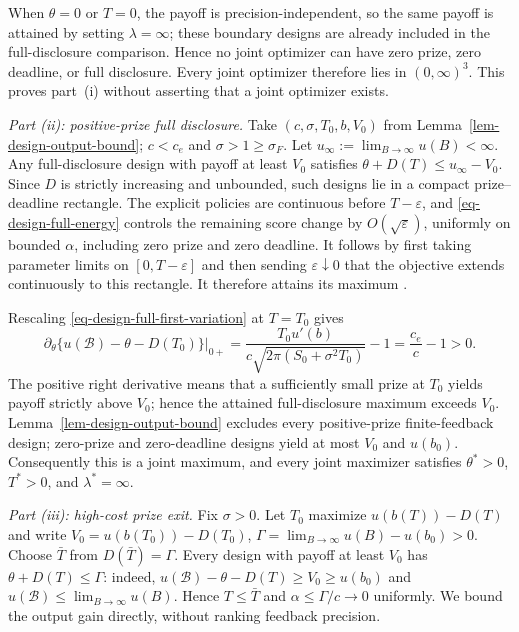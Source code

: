 \documentclass[mnsc]{informs3}
\begin{document}
\begin{APPENDICES}
{When $\theta=0$ or $T=0$, the payoff is precision-independent, so the
same payoff is attained by setting $\lambda=\infty$; these boundary
designs are already included in the full-disclosure comparison. Hence no
joint optimizer can have zero prize, zero deadline, or full disclosure.
Every joint optimizer therefore lies in $(0,\infty)^3$. This proves
part~(i) without asserting that a joint optimizer exists.


{
\emph{Part (ii): positive-prize full disclosure.}
Take $(c,\sigma,T_0,b,V_0)$ from Lemma~\ref{lem-design-output-bound};
$c<c_e$ and $\sigma>1\geq\sigma_F$.
Let $u_\infty:=\lim_{B\to\infty}u(B)<\infty$. Any full-disclosure
design with payoff at least $V_0$ satisfies
$\theta+D(T)\leq u_\infty-V_0$. Since $D$ is strictly increasing and
unbounded, such designs lie in a compact prize--deadline rectangle.
The explicit policies are continuous before $T-\varepsilon$, and
\eqref{eq-design-full-energy} controls the remaining score change by $O(\sqrt\varepsilon)$,
uniformly on bounded $\alpha$, including zero prize and zero deadline.
It follows by first taking parameter limits on $[0,T-\varepsilon]$ and
then sending $\varepsilon\downarrow0$ that the objective extends
continuously to this rectangle. It therefore attains its maximum
\citep[][Chapter~6]{Berge1963}.

Rescaling \eqref{eq-design-full-first-variation} at $T=T_0$ gives
\begin{equation}\label{eq-design-full-entry-variation}
\left.\partial_\theta\{u(\mathcal B)-\theta-D(T_0)\}\right|_{0+}
=\frac{T_0u'(b)}{c\sqrt{2\pi(S_0+\sigma^2T_0)}}-1
=\frac{c_e}{c}-1>0.
\end{equation}
The positive right derivative means that a sufficiently small prize at
$T_0$ yields payoff strictly above $V_0$; hence the attained
full-disclosure maximum exceeds $V_0$.
Lemma~\ref{lem-design-output-bound} excludes every positive-prize
finite-feedback design; zero-prize and zero-deadline designs yield
at most $V_0$ and $u(b_0)$.
Consequently this is a joint maximum, and every joint maximizer satisfies
$\theta^*>0$, $T^*>0$, and $\lambda^*=\infty$.
}

\emph{Part (iii): high-cost prize exit.}
Fix $\sigma>0$. Let $T_0$ maximize $u(b(T))-D(T)$ and write
$V_0=u(b(T_0))-D(T_0)$,
$\Gamma=\lim_{B\to\infty}u(B)-u(b_0)>0$.
Choose $\bar T$ from $D(\bar T)=\Gamma$.
Every design with payoff at least $V_0$ has
$\theta+D(T)\le\Gamma$: indeed,
$u(\mathcal B)-\theta-D(T)\geq V_0\geq u(b_0)$ and
$u(\mathcal B)\leq\lim_{B\to\infty}u(B)$. Hence $T\le\bar T$ and
$\alpha\le\Gamma/c\to0$ uniformly. We bound the output gain directly,
without ranking feedback precision.

}
\end{APPENDICES}
\end{document}
